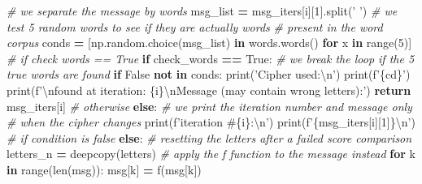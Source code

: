 \documentclass[]{article}
\newenvironment{Shaded}{\begin{snugshade}}{\end{snugshade}}
\newcommand{\BuiltInTok}[1]{#1}
\newcommand{\CharTok}[1]{\textcolor[rgb]{0.31,0.60,0.02}{#1}}
\newcommand{\CommentTok}[1]{\textcolor[rgb]{0.56,0.35,0.01}{\textit{#1}}}
\newcommand{\ControlFlowTok}[1]{\textcolor[rgb]{0.13,0.29,0.53}{\textbf{#1}}}
\newcommand{\DecValTok}[1]{\textcolor[rgb]{0.00,0.00,0.81}{#1}}
\newcommand{\KeywordTok}[1]{\textcolor[rgb]{0.13,0.29,0.53}{\textbf{#1}}}
\newcommand{\NormalTok}[1]{#1}
\newcommand{\OperatorTok}[1]{\textcolor[rgb]{0.81,0.36,0.00}{\textbf{#1}}}
\newcommand{\SpecialCharTok}[1]{\textcolor[rgb]{0.00,0.00,0.00}{#1}}
\newcommand{\SpecialStringTok}[1]{\textcolor[rgb]{0.31,0.60,0.02}{#1}}
\newcommand{\StringTok}[1]{\textcolor[rgb]{0.31,0.60,0.02}{#1}}
\newcommand{\VariableTok}[1]{\textcolor[rgb]{0.00,0.00,0.00}{#1}}
\begin{document}
\begin{Shaded}
\begin{Highlighting}[]
            \CommentTok{# we separate the message by words}
\NormalTok{            msg_list }\OperatorTok{=}\NormalTok{ msg_iters[i][}\DecValTok{1}\NormalTok{].split(}\StringTok{' '}\NormalTok{)}
            \CommentTok{# we test 5 random words to see if they are actually words }
            \CommentTok{# present in the word corpus}
\NormalTok{            conds }\OperatorTok{=}\NormalTok{ [np.random.choice(msg_list) }\KeywordTok{in}\NormalTok{ words.words() }\ControlFlowTok{for}\NormalTok{ x }\KeywordTok{in} \BuiltInTok{range}\NormalTok{(}\DecValTok{5}\NormalTok{)]}
            \CommentTok{# if check words == True}
            \ControlFlowTok{if}\NormalTok{ check_words }\OperatorTok{==} \VariableTok{True}\NormalTok{:}
                \CommentTok{# we break the loop if the 5 true words are found}
                \ControlFlowTok{if} \VariableTok{False} \KeywordTok{not} \KeywordTok{in}\NormalTok{ conds:}
                    \BuiltInTok{print}\NormalTok{(}\StringTok{'Cipher used:}\CharTok{\textbackslash{}n}\StringTok{'}\NormalTok{)}
                    \BuiltInTok{print}\NormalTok{(}\SpecialStringTok{f'}\SpecialCharTok{\{cd\}}\SpecialStringTok{'}\NormalTok{)}
                    \BuiltInTok{print}\NormalTok{(}\SpecialStringTok{f'}\CharTok{\textbackslash{}n}\SpecialStringTok{found at iteration: }\SpecialCharTok{\{i\}}\CharTok{\textbackslash{}n}\SpecialStringTok{Message (may contain wrong letters):'}\NormalTok{)}
                    \ControlFlowTok{return}\NormalTok{ msg_iters[i]}
            \CommentTok{# otherwise}
            \ControlFlowTok{else}\NormalTok{:}
                \CommentTok{# we print the iteration number and message only }
                \CommentTok{# when the cipher changes}
                \BuiltInTok{print}\NormalTok{(}\SpecialStringTok{f'iteration #}\SpecialCharTok{\{i\}}\SpecialStringTok{:}\CharTok{\textbackslash{}n}\SpecialStringTok{'}\NormalTok{)}
                \BuiltInTok{print}\NormalTok{(}\SpecialStringTok{f'}\SpecialCharTok{\{}\NormalTok{msg_iters[i][}\DecValTok{1}\NormalTok{]}\SpecialCharTok{\}}\CharTok{\textbackslash{}n}\SpecialStringTok{'}\NormalTok{)}
        \CommentTok{# if condition is false}
        \ControlFlowTok{else}\NormalTok{:}
            \CommentTok{# resetting the letters after a failed score comparison}
\NormalTok{            letters_n }\OperatorTok{=}\NormalTok{ deepcopy(letters)}
            \CommentTok{# apply the f function to the message instead}
            \ControlFlowTok{for}\NormalTok{ k }\KeywordTok{in} \BuiltInTok{range}\NormalTok{(}\BuiltInTok{len}\NormalTok{(msg)):}
\NormalTok{                msg[k] }\OperatorTok{=}\NormalTok{ f(msg[k])}
        

\end{Highlighting}
\end{Shaded}
\end{document}

